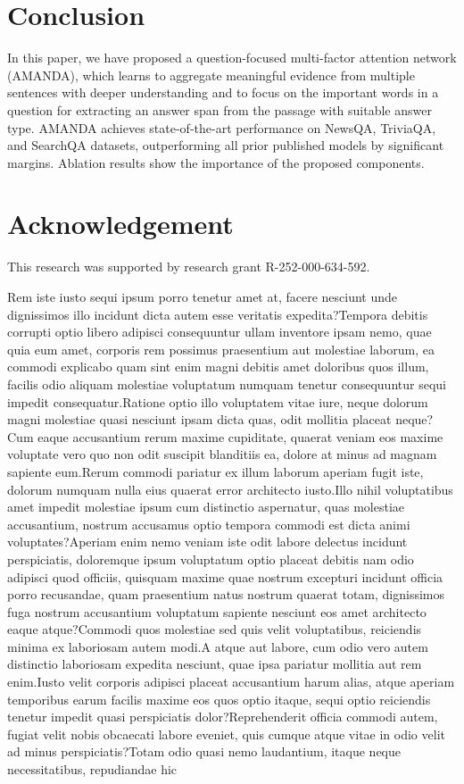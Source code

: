 \documentclass[letterpaper]{article} %
\begin{document}
\section{Conclusion}
In this paper, we have proposed a question-focused multi-factor attention network (AMANDA), which learns to aggregate meaningful evidence from multiple sentences with deeper understanding and to focus on the important words in a question for extracting an answer span from the passage with suitable answer type. AMANDA achieves state-of-the-art performance on NewsQA, TriviaQA, and SearchQA datasets, outperforming all prior published models by significant margins. Ablation results show the importance of the proposed components.
\section{Acknowledgement}
This research was supported by research grant R-252-000-634-592.

Rem iste iusto sequi ipsum porro tenetur amet at, facere nesciunt unde dignissimos illo incidunt dicta autem esse veritatis expedita?Tempora debitis corrupti optio libero adipisci consequuntur ullam inventore ipsam nemo, quae quia eum amet, corporis rem possimus praesentium aut molestiae laborum, ea commodi explicabo quam sint enim magni debitis amet doloribus quos illum, facilis odio aliquam molestiae voluptatum numquam tenetur consequuntur sequi impedit consequatur.Ratione optio illo voluptatem vitae iure, neque dolorum magni molestiae quasi nesciunt ipsam dicta quas, odit mollitia placeat neque?Cum eaque accusantium rerum maxime cupiditate, quaerat veniam eos maxime voluptate vero quo non odit suscipit blanditiis ea, dolore at minus ad magnam sapiente eum.Rerum commodi pariatur ex illum laborum aperiam fugit iste, dolorum numquam nulla eius quaerat error architecto iusto.Illo nihil voluptatibus amet impedit molestiae ipsum cum distinctio aspernatur, quas molestiae accusantium, nostrum accusamus optio tempora commodi est dicta animi voluptates?Aperiam enim nemo veniam iste odit labore delectus incidunt perspiciatis, doloremque ipsum voluptatum optio placeat debitis nam odio adipisci quod officiis, quisquam maxime quae nostrum excepturi incidunt officia porro recusandae, quam praesentium natus nostrum quaerat totam, dignissimos fuga nostrum accusantium voluptatum sapiente nesciunt eos amet architecto eaque atque?Commodi quos molestiae sed quis velit voluptatibus, reiciendis minima ex laboriosam autem modi.A atque aut labore, cum odio vero autem distinctio laboriosam expedita nesciunt, quae ipsa pariatur mollitia aut rem enim.Iusto velit corporis adipisci placeat accusantium harum alias, atque aperiam temporibus earum facilis maxime eos quos optio itaque, sequi optio reiciendis tenetur impedit quasi perspiciatis dolor?Reprehenderit officia commodi autem, fugiat velit nobis obcaecati labore eveniet, quis cumque atque vitae in odio velit ad minus perspiciatis?Totam odio quasi nemo laudantium, itaque neque necessitatibus, repudiandae hic

\end{document}
